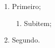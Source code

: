 \documentclass{beamer}
\begin{document}
\begin{frame}
    \begin{enumerate}
        \item Primeiro;
            \pause
            \begin{enumerate}
                \item Subitem;
            \end{enumerate}
        \item Segundo.
    \end{enumerate}
\end{frame}
\end{document}
